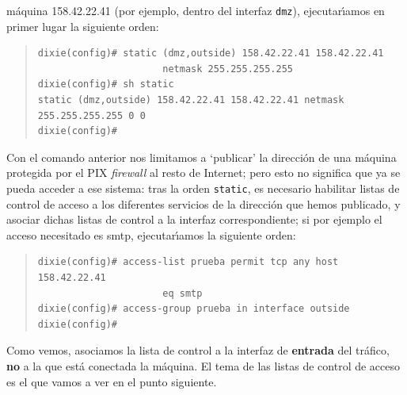 m\'aquina 158.42.22.41 (por ejemplo, dentro del interfaz {\tt dmz}), 
ejecutar\'{\i}amos en primer lugar la siguiente orden:
\begin{quote}
\begin{verbatim}
dixie(config)# static (dmz,outside) 158.42.22.41 158.42.22.41
                      netmask 255.255.255.255
dixie(config)# sh static 
static (dmz,outside) 158.42.22.41 158.42.22.41 netmask 255.255.255.255 0 0
dixie(config)#
\end{verbatim}
\end{quote}
Con el comando anterior nos limitamos a `publicar' la direcci\'on de una 
m\'aquina protegida por el PIX {\it firewall} al resto de Internet; pero esto
no significa que ya se pueda acceder a ese sistema: tras la orden {\tt static},
es necesario habilitar listas de control de acceso a los diferentes servicios de
la direcci\'on que hemos publicado, y asociar dichas listas de control a la
interfaz correspondiente; si por ejemplo el acceso necesitado es {\sc smtp}, 
ejecutar\'{\i}amos la siguiente orden:
\begin{quote}
\begin{verbatim}
dixie(config)# access-list prueba permit tcp any host 158.42.22.41
                      eq smtp
dixie(config)# access-group prueba in interface outside
dixie(config)#
\end{verbatim}
\end{quote}
Como vemos, asociamos la lista de control a la interfaz de {\bf entrada} del
tr\'afico, {\bf no} a la que est\'a conectada la m\'aquina. El tema de las 
listas de control de acceso es el que vamos a ver en el punto siguiente.
